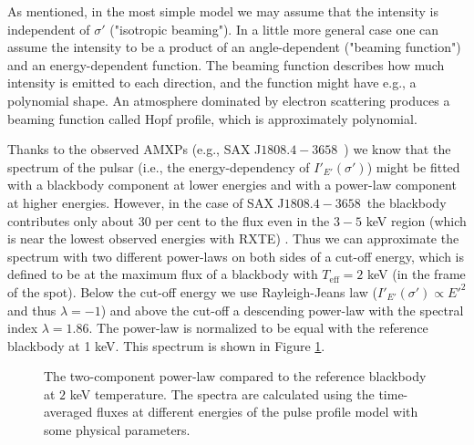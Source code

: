\documentclass{wihuri}
\def\Dop{\delta}
\def\source{SAX J$1808.4-3658$}
\def\ene{E}%
\begin{document}

As mentioned, in the most simple model we may assume that the intensity is independent of $\sigma'$ ("isotropic beaming"). In a little more general case one can assume the intensity to be a product of an angle-dependent ("beaming function") and an energy-dependent function. The beaming function describes how much intensity is emitted to each direction, and the function might have e.g., a polynomial shape. An atmosphere dominated by electron scattering produces a beaming function called Hopf profile, which is approximately polynomial.  


Thanks to the observed AMXPs (e.g., \source \ \cite{poutagierlinskisax}) we know that the spectrum of the pulsar (i.e., the energy-dependency of $I'_{\ene'}(\sigma')$) might be fitted with a blackbody component at lower energies and with a power-law component at higher energies. However, in the case of \source \ the blackbody contributes only about $30$ per cent to the flux even in the $3-5$ keV region (which is near the lowest observed energies with RXTE) \cite{poutagierlinskisax}. Thus we can approximate the spectrum with two different power-laws on both sides of a cut-off energy, which is defined to be at the maximum flux of a blackbody with $T_{\mathrm{eff}} = 2 $ keV (in the frame of the spot). Below the cut-off energy we use Rayleigh-Jeans law ($I'_{\ene'}(\sigma') \propto E '^{2}$ and thus $\lambda = -1$) and above the cut-off a descending power-law with the spectral index $\lambda = 1.86$. The power-law is normalized to be equal with the reference blackbody at 1 keV. This spectrum is shown in Figure \ref{fig:spectrum}.


\begin{figure}
\centerline{}
\caption{The two-component power-law compared to the reference blackbody at $2$ keV temperature. The spectra are calculated using the time-averaged fluxes at different energies of the pulse profile model with some physical parameters. 
\label{fig:spectrum}}
\end{figure}
\end{document}
